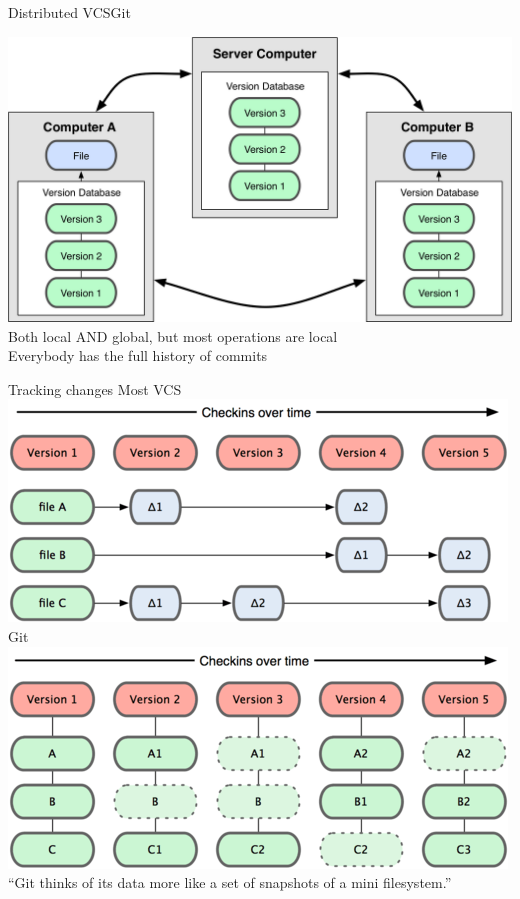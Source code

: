\documentclass[10pt,xcolor=dvipsnames]{beamer}
\begin{document}
\begin{frame}{Distributed VCS}{Git}

\begin{center}
\centering
\includegraphics [scale=0.3]{VCS_distributed.png}\\[0.2in]
Both local AND global, but most operations are local\\
 Everybody has the full history of commits
\end{center}
\end{frame}

\begin{frame}{Tracking changes}
\centering
{\LARGE Most VCS}\\[0.1in]
\includegraphics [scale=0.3]{tracking_changes_svn.png}\\[0.2in]
\pause
{\LARGE Git}\\[0.1in]
\includegraphics [scale=0.3]{tracking_changes_git.png}\\[0.1in]
``Git thinks of its data more like a set of snapshots of a mini filesystem.''
\end{frame}
\end{document}
